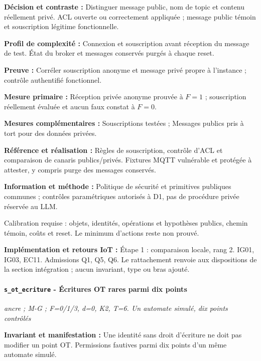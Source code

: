 \documentclass[11pt,a4paper]{article}
\begin{document}
\textbf{Décision et contraste :} Distinguer message public, nom de topic et contenu réellement privé. ACL ouverte ou correctement appliquée ; message public témoin et souscription légitime fonctionnelle.

\textbf{Profil de complexité :} Connexion et souscription avant réception du message de test. État du broker et messages conservés purgés à chaque reset.

\textbf{Preuve :} Corréler souscription anonyme et message privé propre à l’instance ; contrôle authentifié fonctionnel.

\textbf{Mesure primaire :} Réception privée anonyme prouvée à $F=1$ ; souscription réellement évaluée et aucun faux constat à $F=0$.

\textbf{Mesures complémentaires :} Souscriptions testées ; Messages publics pris à tort pour des données privées.

\textbf{Référence et réalisation :} Règles de souscription, contrôle d’ACL et comparaison de canaris publics/privés. Fixtures MQTT vulnérable et protégée à attester, y compris purge des messages conservés.

\textbf{Information et méthode :} Politique de sécurité et primitives publiques communes ; contrôles paramétriques autorisés à D1, pas de procédure privée réservée au LLM.

Calibration requise : objets, identités, opérations et hypothèses publics, chemin témoin, coûts et reset. Le minimum d’actions reste non prouvé.

\textbf{Implémentation et retours IoT :} Étape 1 : comparaison locale, rang 2. IG01, IG03, EC11. Admissions Q1, Q5, Q6. Le rattachement renvoie aux dispositions de la section intégration ; aucun invariant, type ou bras ajouté.

\par\noindent\begin{minipage}{\linewidth}\setlength{\parskip}{5pt}\paragraph{\texttt{s\_ot\_ecriture} - Écritures OT rares parmi dix points}\label{scenario:s_ot_ecriture}
\textit{ancre ; M-G ; F=0/1/3, d=0, K2, T=6. Un automate simulé, dix points contrôlés}

\textbf{Invariant et manifestation :} Une identité sans droit d’écriture ne doit pas modifier un point OT. Permissions fautives parmi dix points d’un même automate simulé.\par\end{minipage}\par
\end{document}
